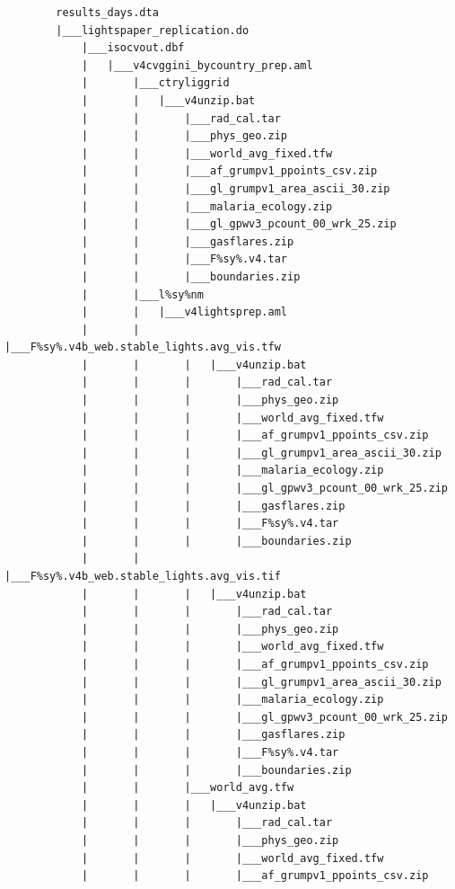 \documentclass[]{book}
\begin{document}
\begin{verbatim}
        results_days.dta
        |___lightspaper_replication.do
            |___isocvout.dbf
            |   |___v4cvggini_bycountry_prep.aml
            |       |___ctryliggrid
            |       |   |___v4unzip.bat
            |       |       |___rad_cal.tar
            |       |       |___phys_geo.zip
            |       |       |___world_avg_fixed.tfw
            |       |       |___af_grumpv1_ppoints_csv.zip
            |       |       |___gl_grumpv1_area_ascii_30.zip
            |       |       |___malaria_ecology.zip
            |       |       |___gl_gpwv3_pcount_00_wrk_25.zip
            |       |       |___gasflares.zip
            |       |       |___F%sy%.v4.tar
            |       |       |___boundaries.zip
            |       |___l%sy%nm
            |       |   |___v4lightsprep.aml
            |       |       |___F%sy%.v4b_web.stable_lights.avg_vis.tfw
            |       |       |   |___v4unzip.bat
            |       |       |       |___rad_cal.tar
            |       |       |       |___phys_geo.zip
            |       |       |       |___world_avg_fixed.tfw
            |       |       |       |___af_grumpv1_ppoints_csv.zip
            |       |       |       |___gl_grumpv1_area_ascii_30.zip
            |       |       |       |___malaria_ecology.zip
            |       |       |       |___gl_gpwv3_pcount_00_wrk_25.zip
            |       |       |       |___gasflares.zip
            |       |       |       |___F%sy%.v4.tar
            |       |       |       |___boundaries.zip
            |       |       |___F%sy%.v4b_web.stable_lights.avg_vis.tif
            |       |       |   |___v4unzip.bat
            |       |       |       |___rad_cal.tar
            |       |       |       |___phys_geo.zip
            |       |       |       |___world_avg_fixed.tfw
            |       |       |       |___af_grumpv1_ppoints_csv.zip
            |       |       |       |___gl_grumpv1_area_ascii_30.zip
            |       |       |       |___malaria_ecology.zip
            |       |       |       |___gl_gpwv3_pcount_00_wrk_25.zip
            |       |       |       |___gasflares.zip
            |       |       |       |___F%sy%.v4.tar
            |       |       |       |___boundaries.zip
            |       |       |___world_avg.tfw
            |       |       |   |___v4unzip.bat
            |       |       |       |___rad_cal.tar
            |       |       |       |___phys_geo.zip
            |       |       |       |___world_avg_fixed.tfw
            |       |       |       |___af_grumpv1_ppoints_csv.zip

\end{verbatim}
\end{document}
